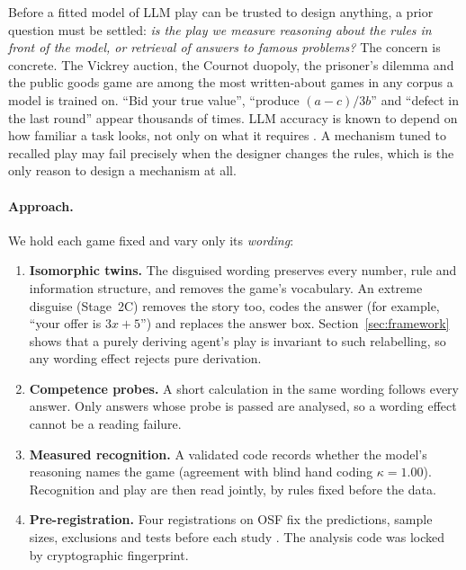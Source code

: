 \documentclass[10pt]{article}
\theoremstyle{definition}
\theoremstyle{remark}
\begin{document}
Before a fitted model of LLM play can be trusted to design anything, a prior question must be
settled: \emph{is the play we measure reasoning about the rules in front of the model, or
retrieval of answers to famous problems?} The concern is concrete. The Vickrey auction, the
Cournot duopoly, the prisoner's dilemma and the public goods game are among the most
written-about games in any corpus a model is trained on. ``Bid your true value'',
``produce $(a-c)/3b$'' and ``defect in the last round'' appear thousands of times. LLM accuracy is
known to depend on how familiar a task looks, not only on what it requires
\citep{mccoy2024embers}. A mechanism tuned to recalled play may fail precisely when the designer
changes the rules, which is the only reason to design a mechanism at all.

\paragraph{Approach.} We hold each game fixed and vary only its \emph{wording}:
\begin{enumerate}[label=(\roman*)]
\item \textbf{Isomorphic twins.} The disguised wording preserves every number, rule and
  information structure, and removes the game's vocabulary. An extreme disguise (Stage~2C)
  removes the story too, codes the answer (for example, ``your offer is $3x+5$'') and replaces
  the answer box. Section~\ref{sec:framework} shows that a purely deriving agent's play is
  invariant to such relabelling, so any wording effect rejects pure derivation.
\item \textbf{Competence probes.} A short calculation in the same wording follows every answer.
  Only answers whose probe is passed are analysed, so a wording effect cannot be a reading
  failure.
\item \textbf{Measured recognition.} A validated code records whether the model's reasoning
  names the game (agreement with blind hand coding $\kappa = 1.00$). Recognition and play are
  then read jointly, by rules fixed before the data.
\item \textbf{Pre-registration.} Four registrations on OSF fix the predictions, sample sizes,
  exclusions and tests before each study \citep{nosek2018prereg}. The analysis code was locked
  by cryptographic fingerprint.
\end{enumerate}
\end{document}
